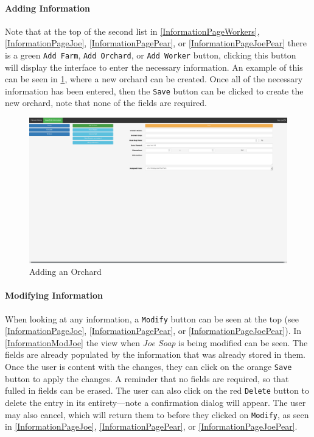\documentclass[a4paper,10pt,titlepage]{article}
\begin{document}
\paragraph{Adding Information}Note that at the top of the second list in \ref{InformationPageWorkers}, \ref{InformationPageJoe}, \ref{InformationPagePear}, or \ref{InformationPageJoePear} there is a green \texttt{Add Farm}, \texttt{Add Orchard}, or \texttt{Add Worker} button, clicking this button will display the interface to enter the necessary information. An example of this can be seen in \ref{InformationAddOrchard}, where a new orchard can be created. Once all of the necessary information has been entered, then the \texttt{Save} button can be clicked to create the new orchard, note that none of the fields are required.

\begin{figure}
 \centering
 \includegraphics[width=12cm, keepaspectratio]{Images/Information-AddOrchard.png}
 \caption{Adding an Orchard}
 \label{InformationAddOrchard}
\end{figure}

\paragraph{Modifying Information}When looking at any information, a \texttt{Modify} button can be seen at the top (see \ref{InformationPageJoe}, \ref{InformationPagePear}, or \ref{InformationPageJoePear}). In \ref{InformationModJoe} the view when \textit{Joe Soap} is being modified can be seen. The fields are already populated by the information that was already stored in them. Once the user is content with the changes, they can click on the orange \texttt{Save} button to apply the changes. A reminder that no fields are required, so that fulled in fields can be erased. The user can also click on the red \texttt{Delete} button to delete the entry in its entirety---note a confirmation dialog will appear. The user may also cancel, which will return them to before they clicked on \texttt{Modify}, as seen in \ref{InformationPageJoe}, \ref{InformationPagePear}, or \ref{InformationPageJoePear}.
\end{document}
